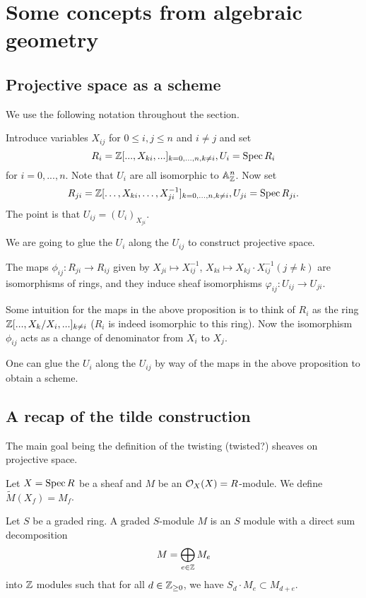 \chapter{Some concepts from algebraic geometry}

\section{Projective space as a scheme}
We use the following notation throughout the section.
\begin{notation}
	Introduce variables $X_{ij}$ for $0 \leq i,j \leq n$ and $i \neq j$ and set \[
    	R_{i} = \mathbb{Z}[..., X_{ki}, ...]_{k=0,...,n, k\neq i}, U_i = \operatorname{Spec} R_i
    \] for $i = 0,...,n$.
	Note that $U_i$ are all isomorphic to $\mathbb{A}^n_{\mathbb{Z}}$. 
	Now set 
	\[
    	R_{ji} = \mathbb{Z}[\dots, X_{ki}, \dots, X_{ji}^{-1}]_{k=0,\dots,n, k\neq i}, U_{ji} = \operatorname{Spec} R_{ji}.
    \] The point is that $U_{ij} = (U_i)_{X_{ji}}$.
\end{notation}
We are going to glue the $U_i$ along the $U_{ij}$ to construct projective space. 
\begin{proposition}
	The maps $\phi_{ij}: R_{ji} \to R_{ij}$ given by $X_{ji} \mapsto X_{ij}^{-1}$, $X_{ki} \mapsto X_{kj} \cdot X_{ij}^{-1} (j \neq k)$ are isomorphisms of rings, and they induce sheaf isomorphisms $\varphi_{ij}: U_{ij} \to U_{ji}$. 
\end{proposition}
Some intuition for the maps in the above proposition is to think of $R_i$ as the ring $\mathbb{Z}[..., {X_k}/{X_i}, ...]_{k\neq i}$ ($R_i$ is indeed isomorphic to this ring). Now the isomorphism $\phi_{ij}$ acts as a change of denominator from $X_i$ to $X_j$. 

\begin{proposition}
	One can glue the $U_i$ along the $U_{ij}$ by way of the maps in the above proposition to obtain a scheme.
\end{proposition}

\section{A recap of the tilde construction}
The main goal being the definition of the twisting (twisted?) sheaves on projective space.
\begin{definition}
	Let $X = \operatorname{Spec} R$ be a sheaf and $M$ be an $\mathcal{O}_X(X) = R$-module.
	We define $\widetilde{M}(X_f) = M_f$. 
\end{definition}

\begin{definition}
	Let $S$ be a graded ring. A graded $S$-module $M$ is an $S$ module with a direct sum decomposition \[
    	M = \bigoplus_{e\in\mathbb{Z}}M_e
    \] into $\mathbb{Z}$ modules such that for all $d \in \mathbb{Z}_{\geq 0}$, we have $S_d \cdot M_e \subset M_{d+e}$. 
\end{definition}


